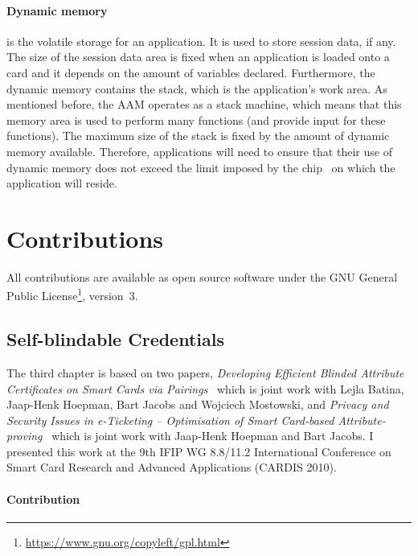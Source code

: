 \paragraph{Dynamic memory} is the volatile storage for an application. It is
used to store session data, if any. The size of the session data area is fixed
when an application is loaded onto a card and it depends on the amount of
variables declared. Furthermore, the dynamic memory contains the stack, which
is the application's work area. As mentioned before, the AAM operates as a
stack machine, which means that this memory area is used to perform many
functions (and provide input for these functions). The maximum size of the
stack is fixed by the amount of dynamic memory available. Therefore,
applications will need to ensure that their use of dynamic memory does not
exceed the limit imposed by the chip~\cite{MIR2012} on which the application
will reside.


\section{Contributions}

All contributions are available as open source software under the GNU General
Public License\footnote{\url{https://www.gnu.org/copyleft/gpl.html}}, version~3.

\subsection{Self-blindable Credentials}

The third chapter is based on two papers, \emph{Developing Efficient Blinded
Attribute Certificates on Smart Cards via Pairings}~\cite{BatinaHJMV10} which
is joint work with Lejla Batina, Jaap-Henk Hoepman, Bart Jacobs and Wojciech
Mostowski, and \emph{Privacy and Security Issues in e-Ticketing -- Optimisation
of Smart Card-based Attribute-proving}~\cite{HoepmanJV10} which is joint work
with Jaap-Henk Hoepman and Bart Jacobs. I presented this work at the 9th IFIP WG
8.8/11.2 International Conference on Smart Card Research and Advanced
Applications (CARDIS 2010).

\paragraph{Contribution}

